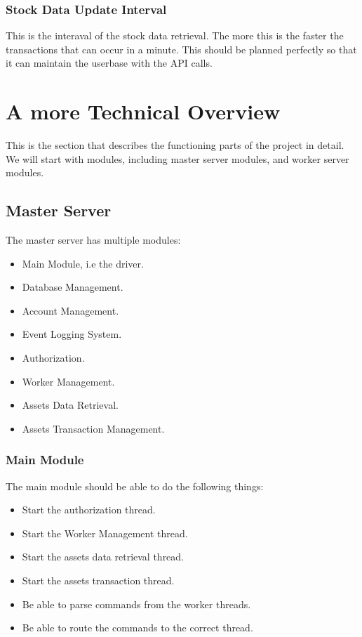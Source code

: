 \documentclass[a4paper]{article}
\begin{document}
\subsubsection{Stock Data Update Interval}
This is the interaval of the stock data retrieval. The more this is the faster
the transactions that can occur in a minute. This should be planned perfectly
so that it can maintain the userbase with the API calls.

\section{A more Technical Overview}
This is the section that describes the functioning parts of the project in
detail. We will start with modules, including master server modules, and worker
server modules.

\subsection{Master Server}
The master server has multiple modules:
\begin{itemize}
	\item Main Module, i.e the driver.
	\item Database Management.
	\item Account Management.
	\item Event Logging System.
	\item Authorization.
	\item Worker Management.
	\item Assets Data Retrieval.
	\item Assets Transaction Management.
\end{itemize}

\subsubsection{Main Module}
The main module should be able to do the following things:
\begin{itemize}
	\item Start the authorization thread.
	\item Start the Worker Management thread.
	\item Start the assets data retrieval thread.
	\item Start the assets transaction thread.
	\item Be able to parse commands from the worker threads.
	\item Be able to route the commands to the correct thread.
\end{itemize}
\end{document}

